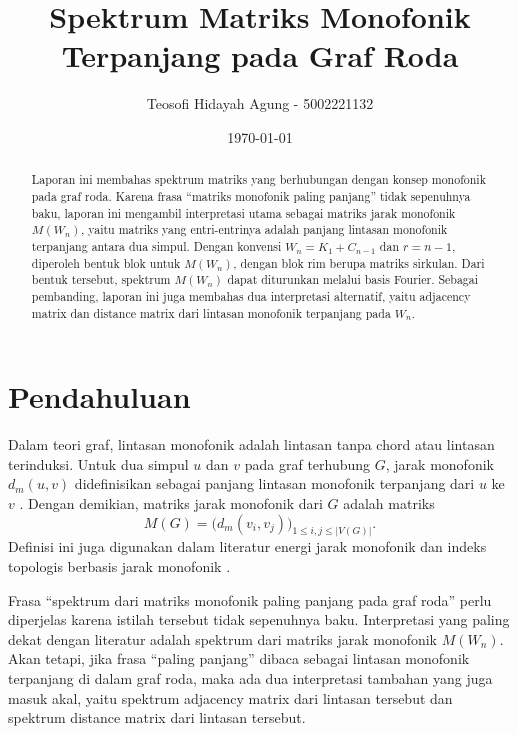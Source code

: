 \documentclass[12pt,a4paper]{article}
\title{\textbf{Spektrum Matriks Monofonik Terpanjang pada Graf Roda}}
\author{Teosofi Hidayah Agung - 5002221132}
\date{\today}
\theoremstyle{definition}
\begin{document}
\maketitle

\begin{abstract}
  Laporan ini membahas spektrum matriks yang berhubungan dengan konsep monofonik pada graf roda. Karena frasa ``matriks monofonik paling panjang'' tidak sepenuhnya baku, laporan ini mengambil interpretasi utama sebagai matriks jarak monofonik $M(W_n)$, yaitu matriks yang entri-entrinya adalah panjang lintasan monofonik terpanjang antara dua simpul. Dengan konvensi $W_n=K_1+C_{n-1}$ dan $r=n-1$, diperoleh bentuk blok untuk $M(W_n)$, dengan blok rim berupa matriks sirkulan. Dari bentuk tersebut, spektrum $M(W_n)$ dapat diturunkan melalui basis Fourier. Sebagai pembanding, laporan ini juga membahas dua interpretasi alternatif, yaitu adjacency matrix dan distance matrix dari lintasan monofonik terpanjang pada $W_n$.
\end{abstract}

\tableofcontents

\section{Pendahuluan}

Dalam teori graf, lintasan monofonik adalah lintasan tanpa chord atau lintasan terinduksi. Untuk dua simpul $u$ dan $v$ pada graf terhubung $G$, jarak monofonik $d_m(u,v)$ didefinisikan sebagai panjang lintasan monofonik terpanjang dari $u$ ke $v$ \citep{titus2017monophonic}. Dengan demikian, matriks jarak monofonik dari $G$ adalah matriks
\[
  M(G)=\bigl(d_m(v_i,v_j)\bigr)_{1\le i,j\le |V(G)|}.
\]
Definisi ini juga digunakan dalam literatur energi jarak monofonik dan indeks topologis berbasis jarak monofonik \citep{diana2022monophonic,kaladevi2019monophonic}.

Frasa ``spektrum dari matriks monofonik paling panjang pada graf roda'' perlu diperjelas karena istilah tersebut tidak sepenuhnya baku. Interpretasi yang paling dekat dengan literatur adalah spektrum dari matriks jarak monofonik $M(W_n)$. Akan tetapi, jika frasa ``paling panjang'' dibaca sebagai lintasan monofonik terpanjang di dalam graf roda, maka ada dua interpretasi tambahan yang juga masuk akal, yaitu spektrum adjacency matrix dari lintasan tersebut dan spektrum distance matrix dari lintasan tersebut.
\end{document}

